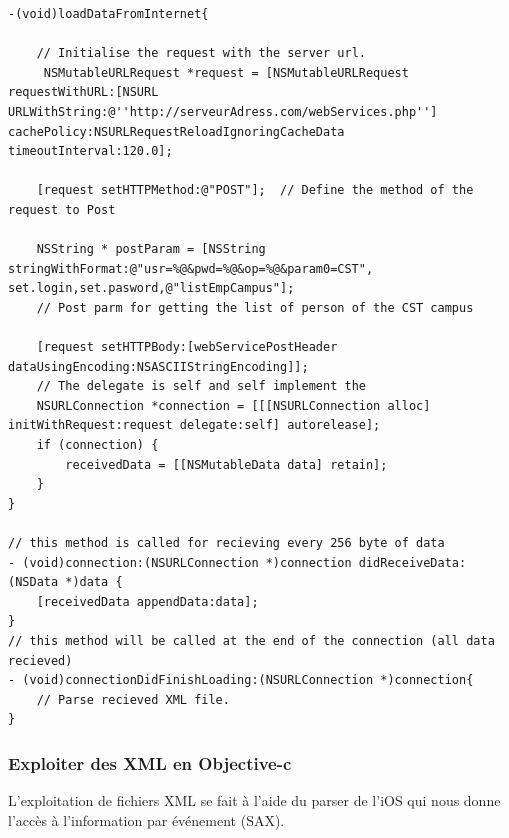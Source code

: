 			\begin{lstlisting}[name= Loading data from internet in Objective-c, label=loadDataFromInternet]
-(void)loadDataFromInternet{

	// Initialise the request with the server url.
     NSMutableURLRequest *request = [NSMutableURLRequest requestWithURL:[NSURL URLWithString:@''http://serveurAdress.com/webServices.php'']   cachePolicy:NSURLRequestReloadIgnoringCacheData timeoutInterval:120.0]; 
   
    [request setHTTPMethod:@"POST"];  // Define the method of the request to Post
    
    NSString * postParam = [NSString stringWithFormat:@"usr=%@&pwd=%@&op=%@&param0=CST",  set.login,set.pasword,@"listEmpCampus"];
    // Post parm for getting the list of person of the CST campus
                 
    [request setHTTPBody:[webServicePostHeader dataUsingEncoding:NSASCIIStringEncoding]];
	// The delegate is self and self implement the 
    NSURLConnection *connection = [[[NSURLConnection alloc] initWithRequest:request delegate:self] autorelease]; 
    if (connection) { 
        receivedData = [[NSMutableData data] retain];
    } 
}

// this method is called for recieving every 256 byte of data
- (void)connection:(NSURLConnection *)connection didReceiveData:(NSData *)data {
    [receivedData appendData:data];
}
// this method will be called at the end of the connection (all data recieved)
- (void)connectionDidFinishLoading:(NSURLConnection *)connection{
	// Parse recieved XML file.
}
\end{lstlisting}
			\subsubsection{Exploiter des  XML en Objective-c}
			L'exploitation de fichiers XML se fait à l'aide du parser de l'iOS qui nous donne l'accès à l'information par événement (SAX).
			\lstset{
			    style = Xcode,
			    caption=Parsing d'un fichier XML en Objective-c .,
			    breaklines=true,
			    frame=single
			}
			
